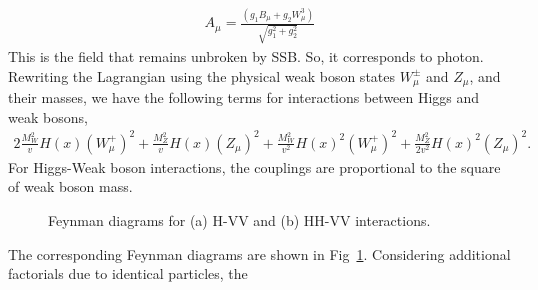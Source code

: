 \begin{eqnarray} 
A_\mu = \frac{\left( g_1 B_\mu + g_2 W_\mu^3 \right)}{\sqrt{g_1^2+g_2^2}}  
\end{eqnarray}
This is the field that remains unbroken by SSB. So, it corresponds to photon. 
Rewriting the Lagrangian using the physical weak boson states $W_\mu^\pm$ and $Z_\mu$,
and their masses, we have the following terms for interactions between Higgs and weak bosons,
\begin{eqnarray} 
2\frac{M_W^2}{v} H\left(x\right) \left( W^+_\mu \right)^2
+ \frac{M_Z^2}{v} H\left(x\right) \left( Z_\mu \right)^2
+ \frac{M_W^2}{v^2} H\left(x\right)^2 \left( W^+_\mu \right)^2
+\frac{M_Z^2}{2v^2} H\left(x\right)^2 \left( Z_\mu \right)^2.
\end{eqnarray} 
For Higgs-Weak boson interactions, the couplings are proportional to the square 
of weak boson mass.
\begin{figure}[htp]
\centering
{}
\hspace{1cm}
\caption{ Feynman diagrams for (a) H-VV and (b) HH-VV interactions.
}
\label{fig:fd_HVterm}
\end{figure}
The corresponding Feynman diagrams are shown in Fig~\ref{fig:fd_HVterm}. 
Considering additional factorials due to identical particles, the 
